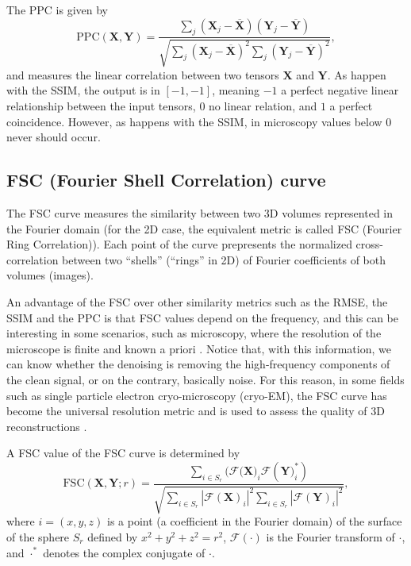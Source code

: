 \documentclass{article}
\begin{document}
The PPC is given
by
\begin{equation}
  \text{PPC}(\mathbf{X}, \mathbf{Y}) = \frac{\sum_j(\mathbf{X}_j - \overline{\mathbf{X}})(\mathbf{Y}_j - \overline{\mathbf{Y}})}{\sqrt{\sum_j (\mathbf{X}_j - \overline{\mathbf{X}})^2 \sum_j (\mathbf{Y}_j - \overline{\mathbf{Y}})^2}},
\end{equation}
and measures the linear correlation between two tensors $\mathbf{X}$
and $\mathbf{Y}$.  As happen with the SSIM, the output is in
$[-1, -1]$, meaning $-1$ a perfect negative linear relationship
between the input tensors, $0$ no linear relation, and $1$ a perfect
coincidence. However, as happens with the SSIM, in microscopy values
below $0$ never should occur.


\subsection{FSC (Fourier Shell Correlation) curve}

The FSC curve measures the similarity between two 3D volumes
represented in the Fourier domain \cite{verbeke2024self} (for the 2D
case, the equivalent metric is called FSC (Fourier Ring
Correlation)). Each point of the curve prepresents the normalized
cross-correlation between two ``shells'' (``rings'' in 2D) of Fourier
coefficients of both volumes (images).

An advantage of the FSC over other similarity metrics such as the
RMSE, the SSIM and the PPC is that FSC values depend on the frequency,
and this can be interesting in some scenarios, such as microscopy,
where the resolution of the microscope is finite and known a priori
\cite{nieuwenhuizen2013measuring}. Notice that, with this information,
we can know whether the denoising is removing the high-frequency
components of the clean signal, or on the contrary, basically
noise. For this reason, in some fields such as single particle
electron cryo-microscopy (cryo-EM), the FSC curve has become the
universal resolution metric and is used to assess the quality of 3D
reconstructions \cite{rosenthal2003optimal,scheres2012prevention}.

A FSC value of the FSC curve is determined by~\cite{verbeke2024self}
\begin{equation}
\text{FSC}(\mathbf{X}, \mathbf{Y}; r) = \frac{\sum_{i \in S_r} (\mathcal{F}(\mathbf{X)}_i \mathcal{F}(\mathbf{Y)}_i^*)}{\sqrt{\sum_{i \in S_r} |\mathcal{F}(\mathbf{X})_i|^2 \sum_{i \in S_r} |\mathcal{F}(\mathbf{Y})_i|^2}},
\end{equation}
where $i=(x, y, z)$ is a point (a coefficient in the Fourier domain)
of the surface of the sphere $S_r$ defined by $x^2+y^2+z^2=r^2$,
$\mathcal{F}(\cdot)$ is the Fourier transform of $\cdot$, and
$\cdot^*$ denotes the complex conjugate of $\cdot$.
\end{document}

